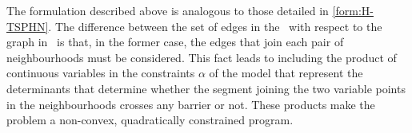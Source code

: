 \documentclass[a4paper,  review, authoryear, 1p., doubleblind]{elsarticle}
\newcommand{\TSPHN}{{\sf{H-TSPHN}\xspace }}
\newcommand{\TSPN}{{\sf{H-TSPN}\xspace }}
\begin{document}
	The formulation described above is analogous to those detailed in \eqref{form:H-TSPHN}.
	The difference between the set of edges in the \TSPN \ with respect to the graph in \TSPHN \ is that, in the former case, the edges that join each pair of neighbourhoods must be considered. This fact leads to including the product of continuous variables in the constraints $\alpha$ of the model that represent the determinants that determine whether the segment joining the two variable points in the neighbourhoods crosses any barrier or not. These products make the problem a non-convex, quadratically constrained program.
	
	
	
	
	
\end{document}
